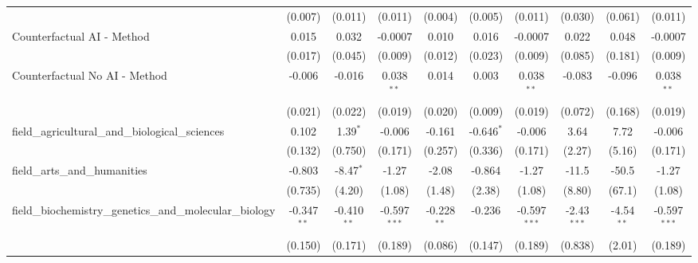 \begin{tabular}{lccccccccc}
                                                               & (0.007)        & (0.011)        & (0.011)        & (0.004)       & (0.005)        & (0.011)        & (0.030)       & (0.061)      & (0.011)\\   
   Counterfactual AI - Method                                  & 0.015          & 0.032          & -0.0007        & 0.010         & 0.016          & -0.0007        & 0.022         & 0.048        & -0.0007\\   
                                                               & (0.017)        & (0.045)        & (0.009)        & (0.012)       & (0.023)        & (0.009)        & (0.085)       & (0.181)      & (0.009)\\   
   Counterfactual No AI - Method                               & -0.006         & -0.016         & 0.038$^{**}$   & 0.014         & 0.003          & 0.038$^{**}$   & -0.083        & -0.096       & 0.038$^{**}$\\   
                                                               & (0.021)        & (0.022)        & (0.019)        & (0.020)       & (0.009)        & (0.019)        & (0.072)       & (0.168)      & (0.019)\\   
   field\_agricultural\_and\_biological\_sciences              & 0.102          & 1.39$^{*}$     & -0.006         & -0.161        & -0.646$^{*}$   & -0.006         & 3.64          & 7.72         & -0.006\\   
                                                               & (0.132)        & (0.750)        & (0.171)        & (0.257)       & (0.336)        & (0.171)        & (2.27)        & (5.16)       & (0.171)\\   
   field\_arts\_and\_humanities                                & -0.803         & -8.47$^{*}$    & -1.27          & -2.08         & -0.864         & -1.27          & -11.5         & -50.5        & -1.27\\   
                                                               & (0.735)        & (4.20)         & (1.08)         & (1.48)        & (2.38)         & (1.08)         & (8.80)        & (67.1)       & (1.08)\\   
   field\_biochemistry\_genetics\_and\_molecular\_biology      & -0.347$^{**}$  & -0.410$^{**}$  & -0.597$^{***}$ & -0.228$^{**}$ & -0.236         & -0.597$^{***}$ & -2.43$^{***}$ & -4.54$^{**}$ & -0.597$^{***}$\\   
                                                               & (0.150)        & (0.171)        & (0.189)        & (0.086)       & (0.147)        & (0.189)        & (0.838)       & (2.01)       & (0.189)\\   

\end{tabular}
